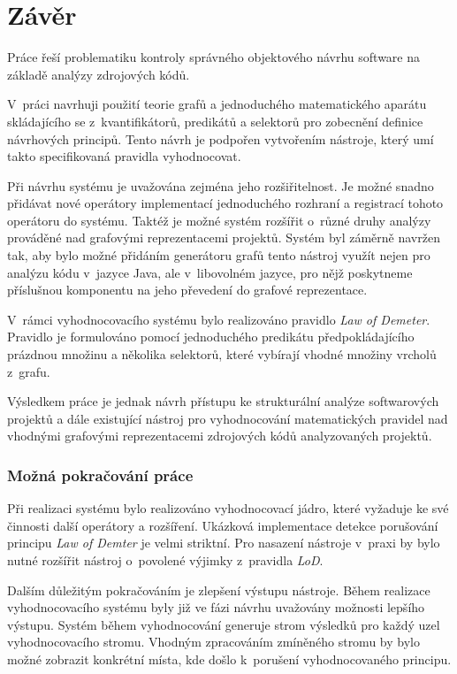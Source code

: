 \chapter{Závěr}

Práce řeší problematiku kontroly správného objektového návrhu software na základě analýzy zdrojových kódů.

V~práci navrhuji použití teorie grafů a jednoduchého matematického aparátu skládajícího se z~kvantifikátorů, predikátů a selektorů pro zobecnění definice návrhových principů. Tento návrh je podpořen vytvořením nástroje, který umí takto specifikovaná pravidla vyhodnocovat.

Při návrhu systému je uvažována zejména jeho rozšiřitelnost. Je možné snadno přidávat nové operátory implementací jednoduchého rozhraní a registrací tohoto operátoru do systému. Taktéž je možné systém rozšířit o~různé druhy analýzy prováděné nad grafovými reprezentacemi projektů. Systém byl záměrně navržen tak, aby bylo možné přidáním generátoru grafů tento nástroj využít nejen pro analýzu kódu v~jazyce Java, ale v~libovolném jazyce, pro nějž poskytneme příslušnou komponentu na jeho převedení do grafové reprezentace.

V~rámci vyhodnocovacího systému bylo realizováno pravidlo \emph{Law of Demeter}. Pravidlo je formulováno pomocí jednoduchého predikátu předpokládajícího prázdnou množinu a několika selektorů, které vybírají vhodné množiny vrcholů z~grafu.

Výsledkem práce je jednak návrh přístupu ke strukturální analýze softwarových projektů a dále existující nástroj pro vyhodnocování matematických pravidel nad vhodnými grafovými reprezentacemi zdrojových kódů analyzovaných projektů.

\subsection*{Možná pokračování práce}
Při realizaci systému bylo realizováno vyhodnocovací jádro, které vyžaduje ke své činnosti další operátory a rozšíření. Ukázková implementace detekce porušování principu \emph{Law of Demter} je velmi striktní. Pro nasazení nástroje v~praxi by bylo nutné rozšířit nástroj o~povolené výjimky z~pravidla \emph{LoD}.

Dalším důležitým pokračováním je zlepšení výstupu nástroje. Během realizace vyhodnocovacího systému byly již ve fázi návrhu uvažovány možnosti lepšího výstupu. Systém během vyhodnocování generuje strom výsledků pro každý uzel vyhodnocovacího stromu. Vhodným zpracováním zmíněného stromu by bylo možné zobrazit konkrétní místa, kde došlo k~porušení vyhodnocovaného principu.
